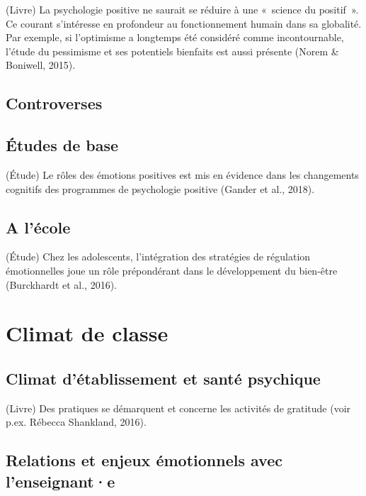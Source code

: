 \documentclass[
  french,
]{article}
\begin{document}
(Livre) La psychologie positive ne saurait se réduire à une «~science du positif~». Ce courant s'intéresse en profondeur au fonctionnement humain dans sa globalité. Par exemple, si l'optimisme a longtemps été considéré comme incontournable, l'étude du pessimisme et ses potentiels bienfaits est aussi présente (Norem \& Boniwell, 2015).

\hypertarget{controverses}{%
\subsection{Controverses}\label{controverses}}

\hypertarget{uxe9tudes-de-base}{%
\subsection{Études de base}\label{uxe9tudes-de-base}}

(Étude) Le rôles des émotions positives est mis en évidence dans les changements cognitifs des programmes de psychologie positive (Gander et al., 2018).

\hypertarget{a-luxe9cole}{%
\subsection{A l'école}\label{a-luxe9cole}}

(Étude) Chez les adolescents, l'intégration des stratégies de régulation émotionnelles joue un rôle prépondérant dans le développement du bien-être (Burckhardt et al., 2016).

\hypertarget{climat-de-classe}{%
\section{Climat de classe}\label{climat-de-classe}}

\hypertarget{climat-duxe9tablissement-et-santuxe9-psychique}{%
\subsection{Climat d'établissement et santé psychique}\label{climat-duxe9tablissement-et-santuxe9-psychique}}

(Livre) Des pratiques se démarquent et concerne les activités de gratitude (voir p.ex. Rébecca Shankland, 2016).

\hypertarget{relations-et-enjeux-uxe9motionnels-avec-lenseignante}{%
\subsection{Relations et enjeux émotionnels avec l'enseignant·e}\label{relations-et-enjeux-uxe9motionnels-avec-lenseignante}}
\end{document}
